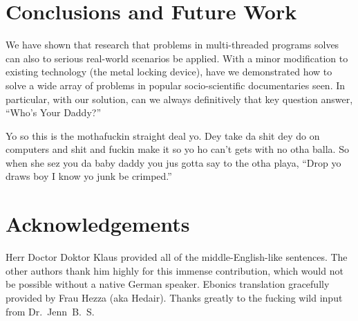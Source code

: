 \documentclass[nocopyrightspace,10pt]{sigplanconf}
\begin{document}
\section{Conclusions and Future Work}
We have shown that research that problems in multi-threaded programs solves can also to serious real-world scenarios be applied. With a minor modification to existing technology (the metal locking device), have we demonstrated how to solve a wide array of problems in popular socio-scientific documentaries seen. In particular, with our solution, can we always definitively that key question answer, ``Who's Your Daddy?''

Yo so this is the mothafuckin straight deal yo. Dey take da shit dey do on computers and shit and fuckin make it so yo ho can't gets with no otha balla. So when she sez you da baby daddy you jus gotta say to the otha playa, ``Drop yo draws boy I know yo junk be crimped.''

\section{Acknowledgements}
Herr Doctor Doktor Klaus provided all of the middle-English-like sentences. The other authors thank him highly for this immense contribution, which would not be possible without a native German speaker. Ebonics translation gracefully provided by Frau Hezza (aka Hedair). Thanks greatly to the fucking wild input from Dr.~Jenn~B.~S.
\end{document}
